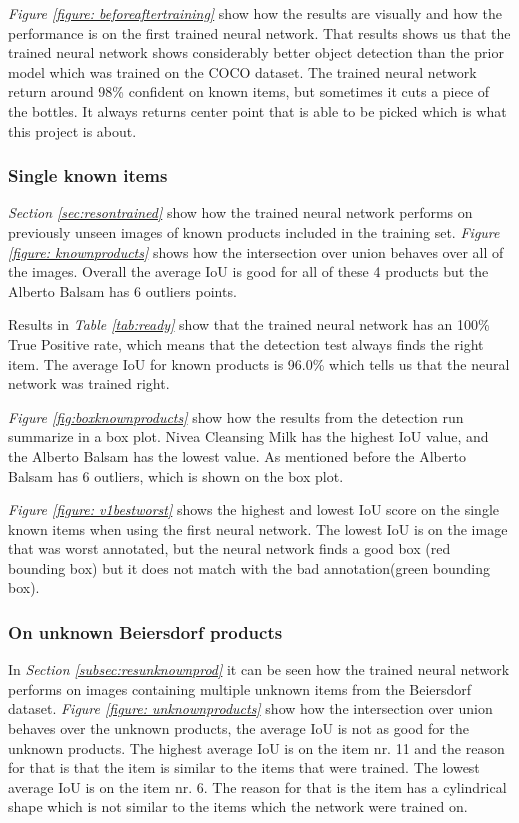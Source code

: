 \textit{Figure \ref{figure: beforeaftertraining}} show how the results are visually and how the performance is on the first trained neural network. That results shows us that the trained neural network shows considerably better object detection than the prior model which was trained on the COCO dataset. The trained neural network return around 98\% confident on known items, but sometimes it cuts a piece of the bottles. It always returns center point that is able to be picked which is what this project is about. 


\subsubsection{Single known items}
\textit{Section \ref{sec:resontrained}} show how the trained neural network performs on previously unseen images of known products included in the training set. \textit{Figure \ref{figure: knownproducts}} shows how the intersection over union behaves over all of the images. Overall the average IoU is good for all of these 4 products but the Alberto Balsam has 6 outliers points.%

Results in \textit{Table \ref{tab:ready}} show that the trained neural network has an 100\% True Positive rate, which means that the detection test always finds the right item. The average IoU for known products is 96.0\% which tells us that the neural network was trained right.

\textit{Figure \ref{fig:boxknownproducts}} show how the results from the detection run summarize in a box plot. Nivea Cleansing Milk has the highest IoU value, and the Alberto Balsam has the lowest value. As mentioned before the Alberto Balsam has 6 outliers, which is shown on the box plot.

\textit{Figure \ref{figure: v1bestworst}} shows the highest and lowest IoU score on the single known items when using the first neural network. The lowest IoU is on the image that was worst annotated, but the neural network finds a good box (red bounding box) but it does not match with the bad annotation(green bounding box).

\subsubsection{On unknown Beiersdorf products}
In \textit{Section \ref{subsec:resunknownprod}} it can be seen how the trained neural network performs on images containing multiple unknown items from the Beiersdorf dataset. \textit{Figure \ref{figure: unknownproducts}} show how the intersection over union behaves over the unknown products, the average IoU is not as good for the unknown products. The highest average IoU is on the item nr. 11 and the reason for that is that the item is similar to the items that were trained. The lowest average IoU is on the item nr. 6. The reason for that is the item has a cylindrical shape which is not similar to the items which the network were trained on.  

